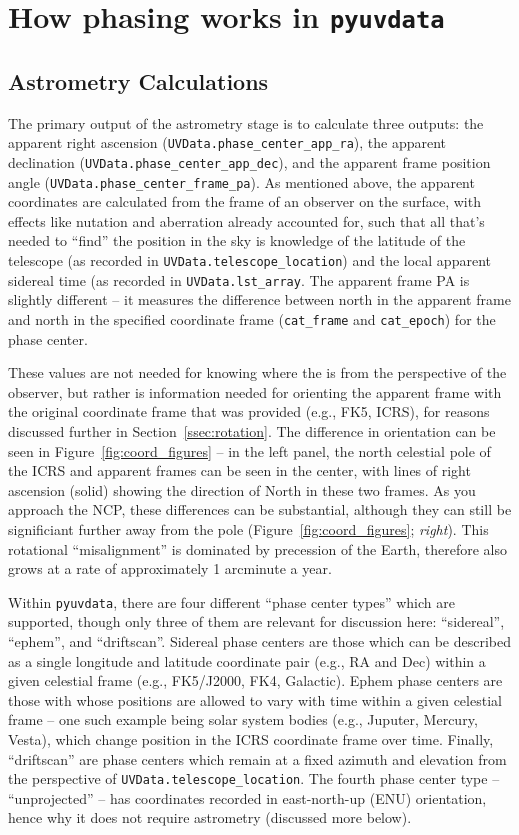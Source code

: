 \documentclass[11pt, oneside]{article}
\begin{document}
\section{How phasing works in \texttt{pyuvdata}}\label{sec:methods}

\subsection{Astrometry Calculations}\label{ssec:astrometry}
The primary output of the astrometry stage is to calculate three outputs: the apparent right ascension (\texttt{UVData.phase\_center\_app\_ra}), the apparent declination (\texttt{UVData.phase\_center\_app\_dec}), and the apparent frame position angle (\texttt{UVData.phase\_center\_frame\_pa}). As mentioned above, the apparent coordinates are calculated from the frame of an observer on the surface, with effects like nutation and aberration already accounted for, such that all that's needed to ``find'' the position in the sky is knowledge of the latitude of the telescope (as recorded in \texttt{UVData.telescope\_location}) and the local apparent sidereal time (as recorded in \texttt{UVData.lst\_array}. The apparent frame PA is slightly different -- it measures the difference between north in the apparent frame and north in the specified coordinate frame (\texttt{cat\_frame} and \texttt{cat\_epoch}) for the phase center. 

These values are not needed for knowing where the is from the perspective of the observer, but rather is information needed for orienting the apparent frame with the original coordinate frame that was provided (e.g., FK5, ICRS),  for reasons discussed further in Section~\ref{ssec:rotation}. The difference in orientation can be seen in Figure~\ref{fig:coord_figures} -- in the left panel, the north celestial pole of the ICRS and apparent frames can be seen in the center, with lines of right ascension (solid) showing the direction of North in these two frames. As you approach the NCP, these differences can be substantial, although they can still be significiant further away from the pole (Figure~\ref{fig:coord_figures}; \emph{right}). This rotational ``misalignment'' is dominated by precession of the Earth, therefore also grows at a rate of approximately 1 arcminute a year.

Within \texttt{pyuvdata}, there are four different ``phase center types'' which are supported, though only three of them are relevant for discussion here: ``sidereal'', ``ephem'', and ``driftscan''.  Sidereal phase centers are those which can be described as a single longitude and latitude coordinate pair (e.g., RA and Dec) within a given celestial frame (e.g., FK5/J2000, FK4, Galactic). Ephem phase centers are those with whose positions are allowed to vary with time within a given celestial frame -- one such example being solar system bodies (e.g., Juputer, Mercury, Vesta), which change position in the ICRS coordinate frame over time. Finally, ``driftscan'' are phase centers which remain at a fixed azimuth and elevation from the perspective of \texttt{UVData.telescope\_location}. The fourth phase center type -- ``unprojected'' -- has coordinates recorded in east-north-up (ENU) orientation, hence why it does not require astrometry (discussed more below).
\end{document}
